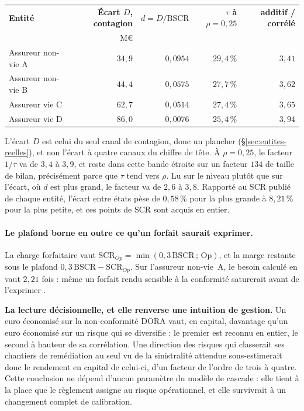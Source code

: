 \begin{center}\small
\renewcommand{\arraystretch}{1.25}
\begin{tabular}{@{}l r r r r@{}}
\toprule
\textbf{Entité} & \textbf{Écart $D$, contagion} & \textbf{$d = D/\mathrm{BSCR}$} &
\textbf{$\tau$ à $\rho = 0{,}25$} & \textbf{additif / corrélé} \\
 & M\euro & & & \\
\midrule
Assureur non-vie A & $34{,}9$ & $0{,}0954$ & $29{,}4\,\%$ & $3{,}41$ \\
Assureur non-vie B & $44{,}4$ & $0{,}0575$ & $27{,}7\,\%$ & $3{,}62$ \\
Assureur vie C & $62{,}7$ & $0{,}0514$ & $27{,}4\,\%$ & $3{,}65$ \\
Assureur vie D & $86{,}0$ & $0{,}0076$ & $25{,}4\,\%$ & $3{,}94$ \\
\bottomrule
\end{tabular}
\end{center}

\vspace{2pt}
\noindent L'écart $D$ est celui du seul canal de contagion, donc un plancher
(\S\ref{sec:entites-reelles}), et non l'écart à quatre canaux du chiffre de tête. À
$\rho = 0{,}25$, le facteur $1/\tau$ va de $3{,}4$ à $3{,}9$, et reste dans cette bande étroite
sur un facteur $134$ de taille de bilan, précisément parce que $\tau$ tend vers $\rho$. Lu sur le niveau plutôt
que sur l'écart, où $d$ est plus grand, le facteur va de $2{,}6$ à $3{,}8$. Rapporté au
SCR publié de chaque entité, l'écart entre états pèse de $0{,}58\,\%$ pour la plus grande
à $8{,}21\,\%$ pour la plus petite, et ces points de SCR sont acquis en entier.

\paragraph{Le plafond borne en outre ce qu'un forfait saurait exprimer.} La charge forfaitaire
vaut $\mathrm{SCR}_{Op}=\min(0{,}3\,\mathrm{BSCR}\,;\,\mathrm{Op})$, et la marge restante sous le
plafond $0{,}3\,\mathrm{BSCR}-\mathrm{SCR}_{Op}$. Sur l'assureur non-vie~A, le besoin calculé en
vaut $2{,}21$ fois : même un forfait rendu sensible à la conformité saturerait avant de
l'exprimer \matcomp.

\begin{cle}
\textbf{La lecture décisionnelle, et elle renverse une intuition de gestion.} Un euro économisé
sur la non-conformité DORA vaut, en capital, davantage qu'un euro économisé sur un risque
qui se diversifie : le premier est reconnu en entier, le second à hauteur de sa corrélation. Une
direction des risques qui classerait ses chantiers de remédiation au seul vu de la sinistralité
attendue sous-estimerait donc le rendement en capital de celui-ci, d'un facteur de l'ordre de
trois à quatre. Cette conclusion ne dépend d'aucun paramètre du modèle de cascade : elle tient à
la place que le règlement assigne au risque opérationnel, et elle survivrait à un changement
complet de calibration.
\end{cle}

